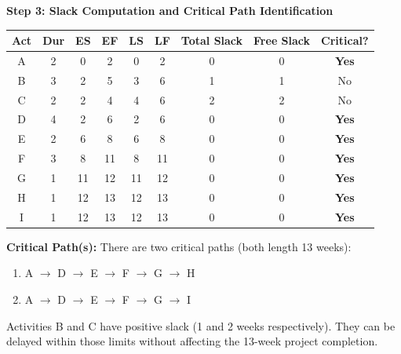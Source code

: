 \documentclass[11pt]{article}
\begin{document}
\begin{exoresolu}
\textbf{Step 3: Slack Computation and Critical Path Identification}

\begin{center}
\begin{tabular}{|c|c|c|c|c|c|c|c|c|}\hline
\rowcolor{popblueL}
\textbf{Act} & \textbf{Dur} & \textbf{ES} & \textbf{EF} & \textbf{LS} & \textbf{LF} & \textbf{Total Slack} & \textbf{Free Slack} & \textbf{Critical?} \\ \hline
A & 2 & 0 & 2 & 0 & 2 & 0 & 0 & \textbf{Yes} \\
B & 3 & 2 & 5 & 3 & 6 & 1 & 1 & No \\
C & 2 & 2 & 4 & 4 & 6 & 2 & 2 & No \\
D & 4 & 2 & 6 & 2 & 6 & 0 & 0 & \textbf{Yes} \\
E & 2 & 6 & 8 & 6 & 8 & 0 & 0 & \textbf{Yes} \\
F & 3 & 8 & 11 & 8 & 11 & 0 & 0 & \textbf{Yes} \\
G & 1 & 11 & 12 & 11 & 12 & 0 & 0 & \textbf{Yes} \\
H & 1 & 12 & 13 & 12 & 13 & 0 & 0 & \textbf{Yes} \\
I & 1 & 12 & 13 & 12 & 13 & 0 & 0 & \textbf{Yes} \\ \hline
\end{tabular}
\end{center}

\textbf{Critical Path(s):} There are two critical paths (both length 13 weeks):
\begin{enumerate}
    \item A $\to$ D $\to$ E $\to$ F $\to$ G $\to$ H
    \item A $\to$ D $\to$ E $\to$ F $\to$ G $\to$ I
\end{enumerate}
Activities B and C have positive slack (1 and 2 weeks respectively). They can be delayed within those limits without affecting the 13-week project completion.


\end{exoresolu}
\end{document}
